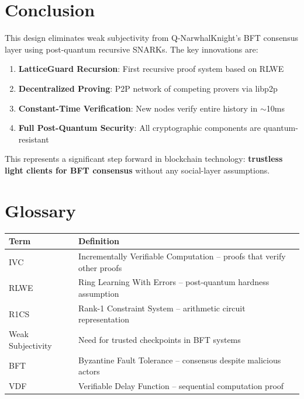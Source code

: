 \documentclass[11pt,a4paper]{article}
\begin{document}
\section{Conclusion}

This design eliminates weak subjectivity from Q-NarwhalKnight's BFT consensus layer using post-quantum recursive SNARKs. The key innovations are:

\begin{enumerate}
    \item \textbf{LatticeGuard Recursion}: First recursive proof system based on RLWE
    \item \textbf{Decentralized Proving}: P2P network of competing provers via libp2p
    \item \textbf{Constant-Time Verification}: New nodes verify entire history in $\sim$10ms
    \item \textbf{Full Post-Quantum Security}: All cryptographic components are quantum-resistant
\end{enumerate}

This represents a significant step forward in blockchain technology: \textbf{trustless light clients for BFT consensus} without any social-layer assumptions.

\appendix

\section{Glossary}

\begin{table}[h]
\centering
\begin{tabular}{lp{10cm}}
\toprule
\textbf{Term} & \textbf{Definition} \\
\midrule
IVC & Incrementally Verifiable Computation -- proofs that verify other proofs \\
RLWE & Ring Learning With Errors -- post-quantum hardness assumption \\
R1CS & Rank-1 Constraint System -- arithmetic circuit representation \\
Weak Subjectivity & Need for trusted checkpoints in BFT systems \\
BFT & Byzantine Fault Tolerance -- consensus despite malicious actors \\
VDF & Verifiable Delay Function -- sequential computation proof \\
\bottomrule
\end{tabular}
\end{table}
\end{document}
